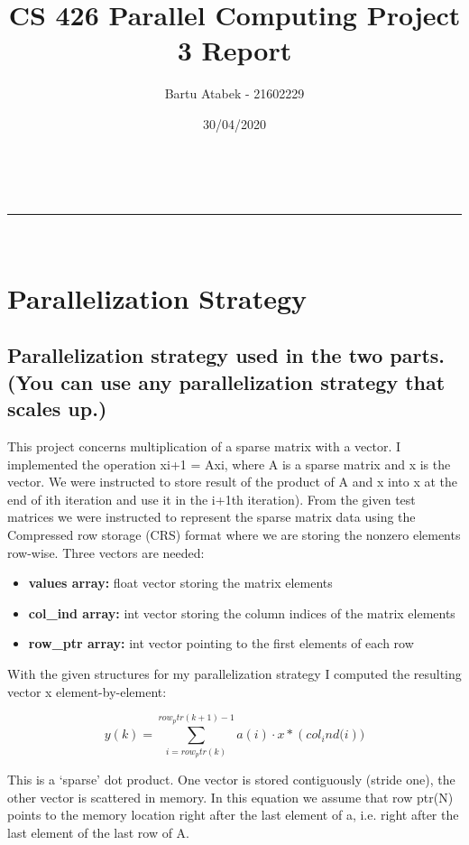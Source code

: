 \documentclass[a4paper,11pt]{article}
\makeatletter
\newcommand{\linia}{\rule{\linewidth}{0.5pt}}
\theoremstyle{mytheor}
\renewcommand{\maketitle}{
\begin{center}
\vspace{2ex}
{\huge \textsc{\@title}}
\vspace{1ex}
\\
\linia\\
\@author \hfill \@date
\vspace{4ex}
\end{center}
}
\makeatother
\begin{document}
\title{CS 426 Parallel Computing Project 3 Report}

\author{Bartu Atabek - 21602229}

\date{30/04/2020}

\maketitle

\section{Parallelization Strategy}
\subsection{Parallelization strategy used in the two parts. (You can use any parallelization strategy that scales up.)}

This project concerns multiplication of a sparse matrix with a vector. I implemented the operation xi+1 = Axi, where A is a sparse matrix and x is the vector. We were instructed to store result of the product of A and x into x at the end of ith iteration and use it in the i+1th iteration).
\newline
\newline
From the given test matrices we were instructed to represent the sparse matrix data using the Compressed row storage (CRS) format where we are storing the nonzero elements row-wise. Three vectors are needed:
\begin{itemize}
	\item \textbf{values array:} float vector storing the matrix elements
	\item \textbf{col\_ind array:} int vector storing the column indices of the matrix elements
	\item \textbf{row\_ptr array:} int vector pointing to the first elements of each row
\end{itemize}

With the given structures for my parallelization strategy I computed the resulting vector x element-by-element:

\begin{equation}
    y(k) =\sum_{i= row_ptr(k)}^{row_ptr(k+1)-1}a(i)\cdot x*({col_ind(i}))
\end{equation}

This is a ‘sparse’ dot product. One vector is stored contiguously
(stride one), the other vector is scattered in memory. In this equation we assume that row ptr(N) points to the memory location right after the last element of a, i.e. right after the last element of the last row of A.
\end{document}
